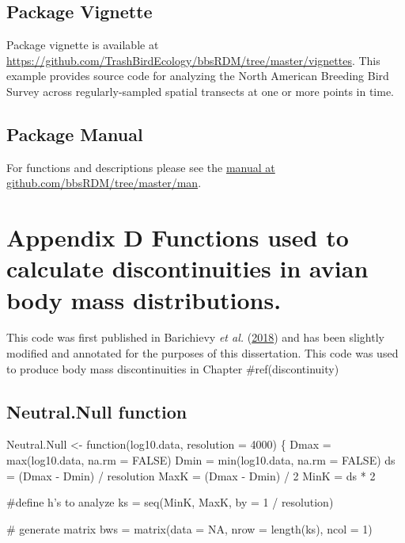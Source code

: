 \documentclass[12pt,twoside,openany]{reedthesis}
\begin{document}
\hypertarget{package-vignette-1}{%
\section{Package Vignette}\label{package-vignette-1}}

Package vignette is available at \url{https://github.com/TrashBirdEcology/bbsRDM/tree/master/vignettes}. This example provides source code for analyzing the North American Breeding Bird Survey across regularly-sampled spatial transects at one or more points in time.

\hypertarget{package-manual-2}{%
\section{Package Manual}\label{package-manual-2}}

For functions and descriptions please see the \href{https://github.com/TrashBirdEcology/bbsRDM/tree/master/man}{manual at github.com/bbsRDM/tree/master/man}.

\appendix

\hypertarget{appDiscont}{%
\chapter*{Appendix D Functions used to calculate discontinuities in avian body mass distributions.}\label{appDiscont}}

This code was first published in Barichievy \emph{et al.} (\protect\hyperlink{ref-barichievy2018method}{2018}) and has been slightly modified and annotated for the purposes of this dissertation. This code was used to produce body mass discontinuities in Chapter \#ref(discontinuity)

\hypertarget{neutral.null-function}{%
\section{Neutral.Null function}\label{neutral.null-function}}

Neutral.Null \textless- function(log10.data, resolution = 4000) \{
Dmax = max(log10.data, na.rm = FALSE)
Dmin = min(log10.data, na.rm = FALSE)
ds = (Dmax - Dmin) / resolution
MaxK = (Dmax - Dmin) / 2
MinK = ds * 2

\#define h's to analyze
ks = seq(MinK, MaxK, by = 1 / resolution)

\# generate matrix
bws = matrix(data = NA,
nrow = length(ks),
ncol = 1)
\end{document}
